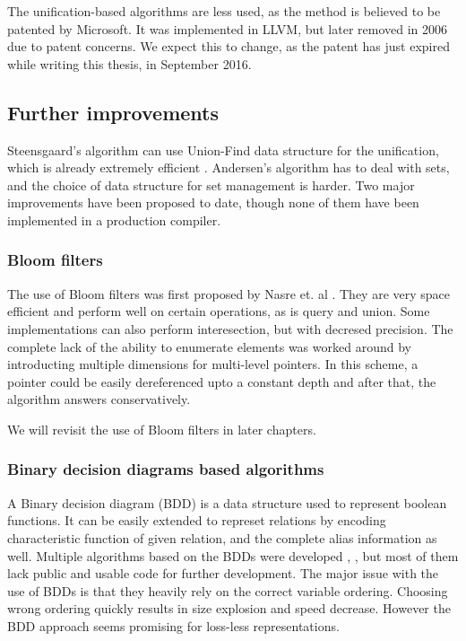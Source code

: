 The unification-based algorithms are less used, as the method is
believed to be patented by Microsoft\cite{patent:steensgaard}. It was
implemented in LLVM, but later removed in 2006 \cite{LLVM:DSA:Remove} due to
patent concerns. We expect this to change, as the patent has just expired while
writing this thesis, in September 2016.

\subsection{Further improvements}

Steensgaard's algorithm can use Union-Find data structure for the unification,
which is already extremely efficient \cite{Tarjan1975}. Andersen's algorithm has
to deal with sets, and the choice of data structure for set management is
harder. Two major improvements have been proposed to date, though none of them
have been implemented in a production compiler.

\subsubsection{Bloom filters}

The use of Bloom filters was first proposed by Nasre et. al \cite{nasre2009}.
They are very space efficient and perform well on certain operations, as is
query and union. Some implementations can also perform interesection, but with
decresed precision. The complete lack of the ability to enumerate elements was
worked around by introducting multiple dimensions for multi-level pointers. In
this scheme, a pointer could be easily dereferenced upto a constant depth and
after that, the algorithm answers conservatively.

We will revisit the use of Bloom filters in later chapters.

\subsubsection{Binary decision diagrams based algorithms}

A Binary decision diagram (BDD) is a data structure used to represent boolean
functions. It can be easily extended to represet relations by encoding
characteristic function of given relation, and the complete alias information as
well. Multiple algorithms based on the BDDs were developed \cite{whaley2004},
\cite{bddbddb}, but most of them lack public and usable code for further
development. The major issue with the use of BDDs is that they heavily rely on
the correct variable ordering. Choosing wrong ordering quickly results in
size explosion and speed decrease. However the BDD approach seems promising for
loss-less representations.

